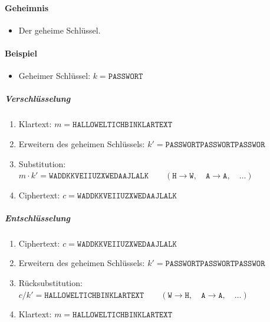 \documentclass[a4paper, 11pt, accentcolor = tud3b]{tudreport}
\begin{document}
                    \paragraph{Geheimnis}
	                    \begin{itemize}
	                    	\item Der geheime Schlüssel.
	                    \end{itemize}
                    
                    \paragraph{Beispiel}
	                    \begin{itemize}
	                    	\item Geheimer Schlüssel: \( k = \texttt{PASSWORT} \)
	                    \end{itemize}
                    
	                    \subparagraph{Verschlüsselung}
		                    \begin{enumerate}
		                    	\item[] Klartext: \( m = \texttt{HALLOWELTICHBINKLARTEXT} \)
		                    	\item Erweitern des geheimen Schlüssels: \( k' = \texttt{PASSWORTPASSWORTPASSWOR} \)
		                    	\item Substitution: \( m \cdot k' = \texttt{WADDKKVEIIUZXWEDAAJLALK} \qquad(\texttt{H} \rightarrow \texttt{W}, \quad\texttt{A} \rightarrow \texttt{A}, \quad\dots) \)
		                    	\item[] Ciphertext: \( c = \texttt{WADDKKVEIIUZXWEDAAJLALK} \)
		                    \end{enumerate}
	                    
	                    \subparagraph{Entschlüsselung}
		                    \begin{enumerate}
		                    	\item[] Ciphertext: \( c = \texttt{WADDKKVEIIUZXWEDAAJLALK} \)
		                    	\item Erweitern des geheimen Schlüssels: \( k' = \texttt{PASSWORTPASSWORTPASSWOR} \)
		                    	\item Rücksubstitution: \( c / k' = \texttt{HALLOWELTICHBINKLARTEXT} \qquad(\texttt{W} \rightarrow \texttt{H}, \quad\texttt{A} \rightarrow \texttt{A}, \quad\dots) \)
		                    	\item[] Klartext: \( m = \texttt{HALLOWELTICHBINKLARTEXT} \)
		                    \end{enumerate}
\end{document}
